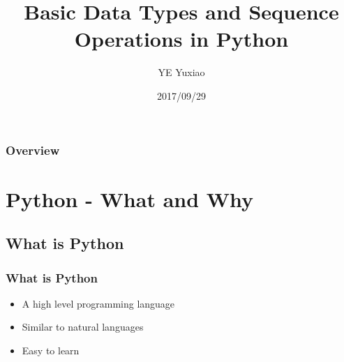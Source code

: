 \documentclass[xcolor={usenames, dvipsnames}, hyperref={colorlinks,linkcolor=black, urlcolor=blue}]{beamer}
\title[Computational Linguistics \emph{Practical}]{Basic Data Types and Sequence Operations in Python} %
\author{YE Yuxiao} %
\institute[] %
{
Tsinghua University \\ %
\medskip
\textit{yeyuxiao@outlook.com} %
}
\date{2017/09/29} %
\begin{document}
\begin{frame}
\titlepage %
\end{frame}

\begin{frame}
\frametitle{Overview} %
\tableofcontents %
\end{frame}


\section{Python - What and Why} %

\subsection{What is Python} %
\begin{frame}
\frametitle{What is Python}

\begin{itemize}
\item A high level programming language
\item Similar to natural languages
\item Easy to learn
\end{itemize}
\end{frame}

\end{document}
